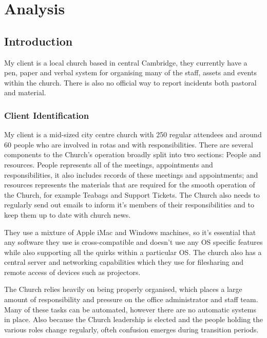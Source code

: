 \chapter{Analysis}

\section{Introduction}
	My client is a local church based in central Cambridge, they currently have a pen, paper and verbal system for organising many of the staff, assets and events within the church. There is also no official way to report incidents both pastoral and material.

\subsection{Client Identification}
	My client is a mid-sized city centre church with 250 regular attendees and around 60 people who are involved in rotas and with responsibilities. There are several components to the Church's operation broadly split into two sections: People and resources. People represents all of the meetings, appointments and responsibilities, it also includes records of these meetings and appointments; and resources represents the materials that are required for the smooth operation of the Church, for example Teabags and Support Tickets. The Church also needs to regularly send out emails to inform it's members of their responsibilities and to keep them up to date with church news.

	They use a mixture of Apple iMac and Windows machines, so it's essential that any software they use is cross-compatible and doesn't use any OS specific features while also supporting all the quirks within a particular OS. The church also has a central server and networking capabilities which they use for filesharing and remote access of devices such as projectors.

	The Church relies heavily on being properly organised, which places a large amount of responsibility and pressure on the office administrator and staff team. Many of these tasks can be automated, however there are no automatic systems in place. Also because the Church leadership is elected and the people holding the various roles change regularly, ofteh confusion emerges during transition periods.

